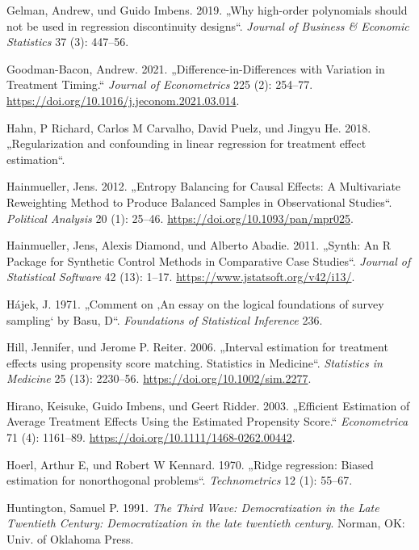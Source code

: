 \documentclass[
  a4paper,
  DIV=11,
  oneside]{scrreprt}
\newlength{\cslhangindent}
\newenvironment{CSLReferences}[2] %
 {\begin{list}{}{%
  \setlength{\itemindent}{0pt}
  \setlength{\leftmargin}{0pt}
  \setlength{\parsep}{0pt}
  \ifodd #1
   \setlength{\leftmargin}{\cslhangindent}
   \setlength{\itemindent}{-1\cslhangindent}
  \fi
  \setlength{\itemsep}{#2\baselineskip}}}
 {\end{list}}
\begin{document}
\begin{CSLReferences}{1}{0}
Gelman, Andrew, und Guido Imbens. 2019. {„Why high-order polynomials
should not be used in regression discontinuity designs``}. \emph{Journal
of Business \& Economic Statistics} 37 (3): 447--56.

Goodman-Bacon, Andrew. 2021. {„Difference-in-Differences with Variation
in Treatment Timing.``} \emph{Journal of Econometrics} 225 (2): 254--77.
\url{https://doi.org/10.1016/j.jeconom.2021.03.014}.

Hahn, P Richard, Carlos M Carvalho, David Puelz, und Jingyu He. 2018.
{„Regularization and confounding in linear regression for treatment
effect estimation``}.

Hainmueller, Jens. 2012. {„Entropy Balancing for Causal Effects: A
Multivariate Reweighting Method to Produce Balanced Samples in
Observational Studies``}. \emph{Political Analysis} 20 (1): 25--46.
\url{https://doi.org/10.1093/pan/mpr025}.

Hainmueller, Jens, Alexis Diamond, und Alberto Abadie. 2011. {„Synth: An
R Package for Synthetic Control Methods in Comparative Case Studies``}.
\emph{Journal of Statistical Software} 42 (13): 1--17.
\url{https://www.jstatsoft.org/v42/i13/}.

Hájek, J. 1971. {„Comment on {‚An essay on the logical foundations of
survey sampling`} by Basu, D``}. \emph{Foundations of Statistical
Inference} 236.

Hill, Jennifer, und Jerome P. Reiter. 2006. {„Interval estimation for
treatment effects using propensity score matching. Statistics in
Medicine``}. \emph{Statistics in Medicine} 25 (13): 2230--56.
\url{https://doi.org/10.1002/sim.2277}.

Hirano, Keisuke, Guido Imbens, und Geert Ridder. 2003. {„Efficient
Estimation of Average Treatment Effects Using the Estimated Propensity
Score.``} \emph{Econometrica} 71 (4): 1161--89.
\url{https://doi.org/10.1111/1468-0262.00442}.

Hoerl, Arthur E, und Robert W Kennard. 1970. {„{Ridge regression: Biased
estimation for nonorthogonal problems}``}. \emph{Technometrics} 12 (1):
55--67.

Huntington, Samuel P. 1991. \emph{The Third Wave: Democratization in the
Late Twentieth Century: Democratization in the late twentieth century}.
Norman, OK: Univ. of Oklahoma Press.


\end{CSLReferences}
\end{document}
